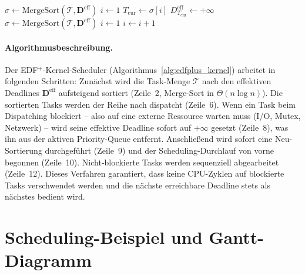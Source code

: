 ﻿\documentclass[a4paper,12pt]{scrreprt}
\theoremstyle{definition}
\begin{document}
	\begin{algorithm}[H]
		\caption{EDF$^+$-Kernel-Scheduler}
		\label{alg:edfplus_kernel}
		\begin{algorithmic}[1]
			\State $\sigma \gets \mathrm{MergeSort}(\mathcal{T}, \mathbf{D}^{\mathrm{eff}})$
			\State $i \gets 1$
			\State $T_{\mathrm{cur}} \gets \sigma[i]$
			\State {}
			 
			\State $D_{T_{\mathrm{cur}}}^{\mathrm{eff}} \gets +\infty$
			\State $\sigma \gets \mathrm{MergeSort}(\mathcal{T}, \mathbf{D}^{\mathrm{eff}})$
			\State $i \gets 1$
			\Else
			\State $i \gets i + 1$
			\EndIf
			\EndWhile
			\EndProcedure
		\end{algorithmic}
	\end{algorithm}

	\paragraph{Algorithmusbeschreibung.}
	Der EDF$^+$-Kernel-Scheduler (Algorithmus~\ref{alg:edfplus_kernel}) arbeitet
	in folgenden Schritten: Zunächst wird die Task-Menge $\mathcal{T}$ nach den
	effektiven Deadlines $\mathbf{D}^{\mathrm{eff}}$ aufsteigend sortiert
	(Zeile~2, Merge-Sort in $\Theta(n \log n)$). Die sortierten Tasks werden
	der Reihe nach dispatcht (Zeile~6). Wenn ein Task beim Dispatching
	blockiert -- also auf eine externe Ressource warten muss (I/O,
	Mutex, Netzwerk) -- wird seine effektive Deadline sofort auf $+\infty$
	gesetzt (Zeile~8), was ihn aus der aktiven Priority-Queue entfernt.
	Anschließend wird sofort eine Neu-Sortierung durchgeführt (Zeile~9) und
	der Scheduling-Durchlauf von vorne begonnen (Zeile~10). Nicht-blockierte
	Tasks werden sequenziell abgearbeitet (Zeile~12). Dieses Verfahren
	garantiert, dass keine CPU-Zyklen auf blockierte Tasks verschwendet werden
	und die nächste erreichbare Deadline stets als nächstes bedient wird.

	\section{Scheduling-Beispiel und Gantt-Diagramm}
\end{document}
